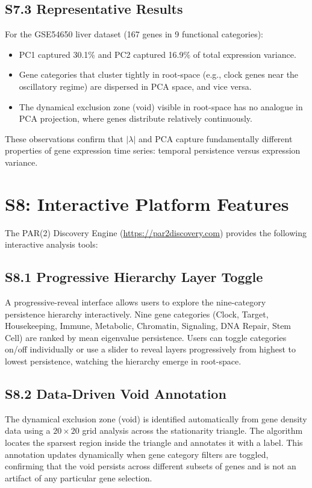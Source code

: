 \documentclass[11pt,a4paper]{article}
\begin{document}
\subsection{S7.3 Representative Results}

For the GSE54650 liver dataset (167 genes in 9 functional categories):
\begin{itemize}
    \item PC1 captured 30.1\% and PC2 captured 16.9\% of total expression variance.
    \item Gene categories that cluster tightly in root-space (e.g., clock genes near the oscillatory regime) are dispersed in PCA space, and vice versa.
    \item The dynamical exclusion zone (void) visible in root-space has no analogue in PCA projection, where genes distribute relatively continuously.
\end{itemize}

\noindent These observations confirm that $|\lambda|$ and PCA capture fundamentally different properties of gene expression time series: temporal persistence versus expression variance.

\section{S8: Interactive Platform Features}

The PAR(2) Discovery Engine (\url{https://par2discovery.com}) provides the following interactive analysis tools:

\subsection{S8.1 Progressive Hierarchy Layer Toggle}

A progressive-reveal interface allows users to explore the nine-category persistence hierarchy interactively. Nine gene categories (Clock, Target, Housekeeping, Immune, Metabolic, Chromatin, Signaling, DNA Repair, Stem Cell) are ranked by mean eigenvalue persistence. Users can toggle categories on/off individually or use a slider to reveal layers progressively from highest to lowest persistence, watching the hierarchy emerge in root-space.

\subsection{S8.2 Data-Driven Void Annotation}

The dynamical exclusion zone (void) is identified automatically from gene density data using a $20 \times 20$ grid analysis across the stationarity triangle. The algorithm locates the sparsest region inside the triangle and annotates it with a label. This annotation updates dynamically when gene category filters are toggled, confirming that the void persists across different subsets of genes and is not an artifact of any particular gene selection.
\end{document}
